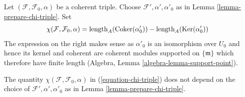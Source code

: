 \noindent
Let $(\mathcal{F}, \mathcal{F}_0, \alpha)$ be a coherent triple.
Choose $\mathcal{F}', \alpha', \alpha'_0$ as in
Lemma \ref{lemma-prepare-chi-triple}. Set
\begin{equation}
\label{equation-chi-triple}
\chi(\mathcal{F}, \mathcal{F}_0, \alpha) =
\text{length}_A(\mathop{\mathrm{Coker}}(\alpha'_0)) - 
\text{length}_A(\mathop{\mathrm{Ker}}(\alpha'_0))
\end{equation}
The expression on the right makes sense as $\alpha'_0$ is an isomorphism
over $U_0$ and hence its kernel and coherent are coherent modules supported
on $\{\mathfrak m\}$ which therefore have finite length
(Algebra, Lemma \ref{algebra-lemma-support-point}).

\begin{lemma}
\label{lemma-well-defined-chi-triple}
The quantity $\chi(\mathcal{F}, \mathcal{F}_0, \alpha)$ in
(\ref{equation-chi-triple}) does not depend on the choice of
$\mathcal{F}', \alpha', \alpha'_0$ as in Lemma \ref{lemma-prepare-chi-triple}.
\end{lemma}

